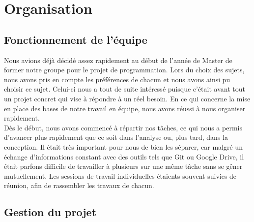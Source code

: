 \documentclass[16pts]{report}
\begin{document}

\nocite{*}

\chapter{Organisation}
\label{cha:Organisation}

\section{Fonctionnement de l'équipe}
\label{sec:Fonctionnement de l'équipe}

Nous avions déjà décidé assez rapidement au début de l'année de Master 
de former notre groupe pour le projet de programmation. Lors du choix 
des sujets, nous avons pris en compte les préférences de chacun et nous 
avons ainsi pu choisir ce sujet. Celui-ci nous a tout de suite intéressé 
puisque c'était avant tout un projet concret qui vise à répondre à un 
réel besoin.
En ce qui concerne la mise en place des bases de notre travail en 
équipe, nous avons réussi à nous organiser rapidement. 
\\
Dès le début, nous avons commencé à répartir nos tâches, ce qui nous a 
permis d’avancer plus rapidement que ce soit dans l’analyse ou, plus tard, 
dans la conception. Il était très important pour nous de bien les séparer, 
car malgré un échange d’informations constant avec des outils tels que 
Git ou Google Drive, il était parfons difficile de travailler à plusieurs 
sur une même tâche sans se gêner mutuellement. Les sessions de travail 
individuelles étaients souvent suivies de réunion, afin de rassembler 
les travaux de chacun.
\\


\section{Gestion du projet}
\label{sec:Gestion du projet}
\end{document}
